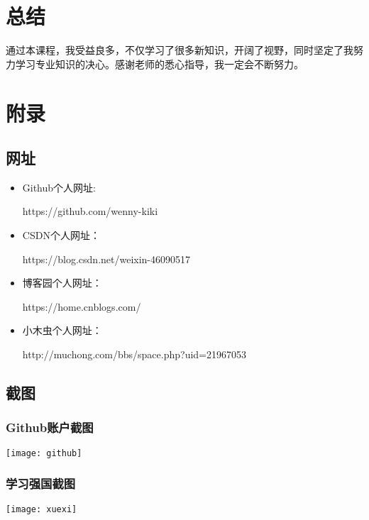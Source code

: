 \documentclass{article}
\begin{document}
\section{总结}
通过本课程，我受益良多，不仅学习了很多新知识，开阔了视野，同时坚定了我努力学习专业知识的决心。感谢老师的悉心指导，我一定会不断努力。\par


\section{附录}
\subsection{网址}
\begin{itemize}
	\item Github个人网址:\par
	https://github.com/wenny-kiki
	\item CSDN个人网址：\par
	https://blog.csdn.net/weixin-46090517
	\item 博客园个人网址：\par
	https://home.cnblogs.com/
	\item 小木虫个人网址：\par
	http://muchong.com/bbs/space.php?uid=21967053
\end{itemize}
\subsection{截图}
\subsubsection{Github账户截图}
%	
%	
%	
\begin{center}
	\texttt{[image: github]}
\end{center}
\subsubsection{学习强国截图}
\begin{center}
	\texttt{[image: xuexi]}
\end{center}
\end{document}
